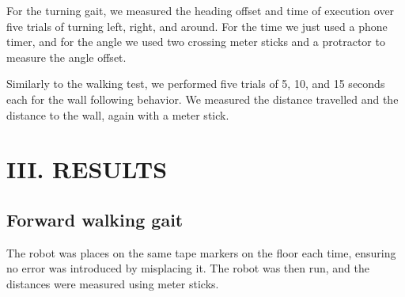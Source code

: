\documentclass[11pt]{article}
\begin{document}
For the turning gait, we measured the heading offset and time of execution over five trials of turning left, right, and around. For the time we just used a phone timer, and for the angle we used two crossing meter sticks and a protractor to measure the angle offset.

Similarly to the walking test, we performed five trials of 5, 10, and 15 seconds each for the wall following behavior. We measured the distance travelled and the distance to the wall, again with a meter stick.

\section*{III. RESULTS}

\subsection*{Forward walking gait}

The robot was places on the same tape markers on the floor each time, ensuring no error was introduced by misplacing it. The robot was then run, and the distances were measured using meter sticks.
\end{document}
